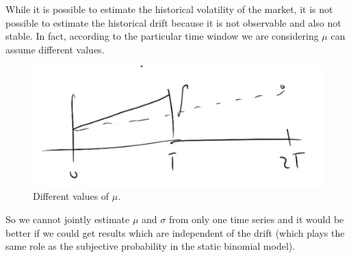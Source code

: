 \newline While it is possible to estimate the historical volatility of the market, it is not possible to estimate the historical drift because it is not observable and also not stable. In fact, according to the particular time window we are considering $\mu$ can assume different values.
\begin{figure}[htp]
    \centering
    \includegraphics[scale=0.3]{fig/tmp/fig11.png}
    \caption{Different values of $\mu$.}
    \label{fig:mu}
\end{figure}
\newline So we cannot jointly estimate $\mu$ and $\sigma$ from only one time series and it would be better if we could get results which are independent of the drift (which plays the same role as the subjective probability in the static binomial model). 

